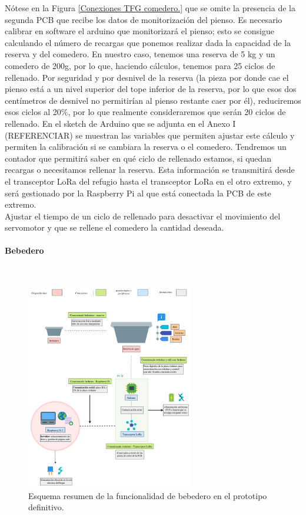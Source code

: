 \documentclass[12pt]{article}
\newcommand{\subsubsubsection}[1]{\paragraph{#1}\mbox{}\\}
\begin{document}
	\noindent Nótese en la Figura \ref{Conexiones TFG comedero.} que se omite la presencia de la segunda PCB que recibe los datos de monitorización del pienso.  Es necesario calibrar en software el arduino que monitorizará el pienso; esto se consigue calculando el número de recargas que ponemos realizar dada la capacidad de la reserva y del comedero. En nuestro caso, tenemos una reserva de 5 kg y un comedero de 200g, por lo que, haciendo cálculos, tenemos para 25 ciclos de rellenado. Por seguridad y por desnivel de la reserva (la pieza por donde cae el pienso está a un nivel superior del tope inferior de la reserva, por lo que esos dos centímetros de desnivel no permitirían al pienso restante caer por él), reduciremos esos ciclos al 20\%, por lo que realmente consideraremos que serán 20 ciclos de rellenado. En el sketch de Arduino que se adjunta en el Anexo I (REFERENCIAR)  se muestran las variables que permiten ajustar este cálculo y permiten la calibración si se cambiara la reserva o el comedero. Tendremos un contador que permitirá saber en qué ciclo de rellenado estamos, si quedan recargas o necesitamos rellenar la reserva. Esta información se transmitirá desde el transceptor LoRa del refugio hasta el transceptor LoRa en el otro extremo, y será gestionado por la Raspberry Pi al que está conectada la PCB de este extremo.\\ 
	
	\noindent Ajustar el tiempo de un ciclo de rellenado para desactivar el movimiento del servomotor y que se rellene el comedero la cantidad deseada. \\
	
	\pagebreak
	
	\subsubsubsection{Bebedero}
	\begin{figure}[h!]
		\begin{center}
			\includegraphics[width=0.65\textwidth]{img/conexiones tfg-bebedero.png}
			\caption{Esquema resumen de la funcionalidad de bebedero en el prototipo definitivo.}
			\label{Conexiones TFG bebedero.}
		\end{center}
	\end{figure}
	
\end{document}
